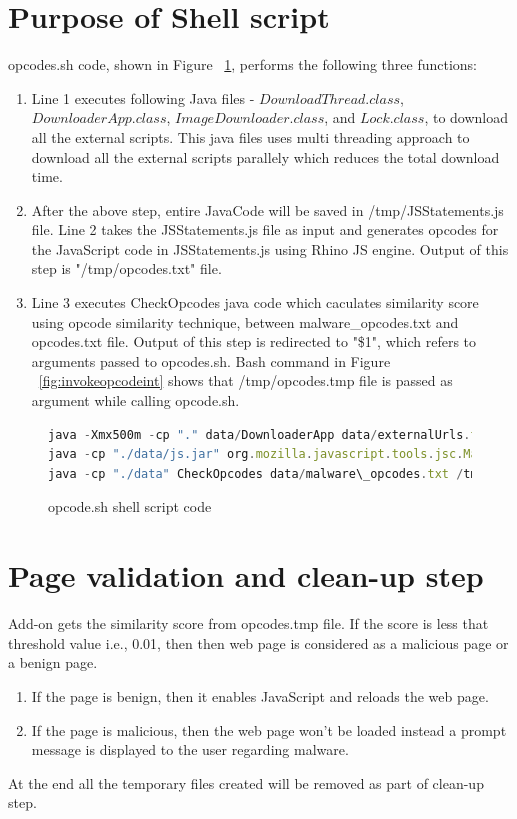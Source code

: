 \section{Purpose of Shell script}

opcodes.sh code, shown in Figure ~\ref{fig:shellscriptcode}, performs the following three functions:
\begin{enumerate}
\item Line 1 executes following Java files - $DownloadThread.class$, $DownloaderApp.class$, $ImageDownloader.class$, and $Lock.class$, to download all the external scripts. This java files uses multi threading approach to download all the external scripts parallely which reduces the total download time.  
\item After the above step, entire JavaCode will be saved in /tmp/JSStatements.js file. Line 2 takes the JSStatements.js file as input and generates opcodes for the JavaScript code in JSStatements.js using Rhino JS engine. Output of this step is "/tmp/opcodes.txt" file.
\item Line 3 executes CheckOpcodes java code which caculates similarity score using opcode similarity technique, between malware\_opcodes.txt and opcodes.txt file. Output of this step is redirected to "\$1", which refers to arguments passed to opcodes.sh. Bash command in Figure ~\ref{fig:invokeopcodeint} shows that /tmp/opcodes.tmp file is passed as argument while calling opcode.sh. 
\end{enumerate}

\begin{figure}[h]
  \centering
\begin{lstlisting}[frame=single,language=JavaScript,mathescape=false]
java -Xmx500m -cp "." data/DownloaderApp data/externalUrls.txt
java -cp "./data/js.jar" org.mozilla.javascript.tools.jsc.Main /tmp/JSStatements.js > /tmp/opcodes.txt
java -cp "./data" CheckOpcodes data/malware\_opcodes.txt /tmp/opcodes.txt > $1
\end{lstlisting}
\caption[opcode.sh shell script code]{opcode.sh shell script code}
    \label{fig:shellscriptcode}
\end{figure}

\section{Page validation and clean-up step}

Add-on gets the similarity score from opcodes.tmp file. If the score is less that threshold value i.e., 0.01, then then web page is considered as a malicious page or a benign page. 
\begin{enumerate}
\item If the page is benign, then it enables JavaScript and reloads the web page.
\item If the page is malicious, then the web page won't be loaded instead a prompt message is displayed to the user regarding malware.
\end{enumerate}
At the end all the temporary files created will be removed as part of clean-up step.

